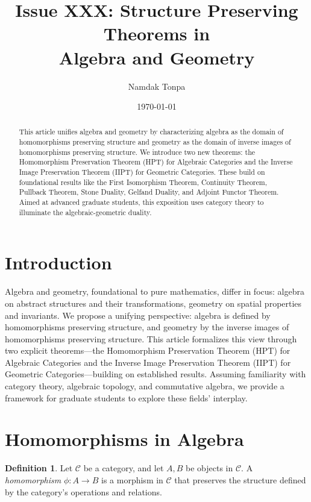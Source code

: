 \documentclass{article}
\title{Issue XXX: Structure Preserving Theorems in \\ Algebra and Geometry}
\author{Namdak Tonpa}
\date{\today}
\theoremstyle{plain}
\theoremstyle{definition}
\newtheorem{definition}{Definition}
\begin{document}
\maketitle

\begin{abstract}
This article unifies algebra and geometry by characterizing algebra
as the domain of homomorphisms preserving structure and geometry
as the domain of inverse images of homomorphisms preserving structure.
We introduce two new theorems: the Homomorphism Preservation Theorem (HPT)
for Algebraic Categories and the Inverse Image Preservation Theorem (IIPT)
for Geometric Categories. These build on foundational results like the
First Isomorphism Theorem, Continuity Theorem, Pullback Theorem,
Stone Duality, Gelfand Duality, and Adjoint Functor Theorem.
Aimed at advanced graduate students, this exposition uses category
theory to illuminate the algebraic-geometric duality.
\end{abstract}

\section{Introduction}
Algebra and geometry, foundational to pure mathematics, differ in focus: algebra on abstract structures and their transformations, geometry on spatial properties and invariants. We propose a unifying perspective: algebra is defined by homomorphisms preserving structure, and geometry by the inverse images of homomorphisms preserving structure. This article formalizes this view through two explicit theorems—the Homomorphism Preservation Theorem (HPT) for Algebraic Categories and the Inverse Image Preservation Theorem (IIPT) for Geometric Categories—building on established results. Assuming familiarity with category theory, algebraic topology, and commutative algebra, we provide a framework for graduate students to explore these fields’ interplay.

\section{Homomorphisms in Algebra}
\begin{definition}
Let \(\mathcal{C}\) be a category, and let \(A, B\) be objects in \(\mathcal{C}\). A \emph{homomorphism} \(\phi: A \to B\) is a morphism in \(\mathcal{C}\) that preserves the structure defined by the category’s operations and relations.
\end{definition}
\end{document}
